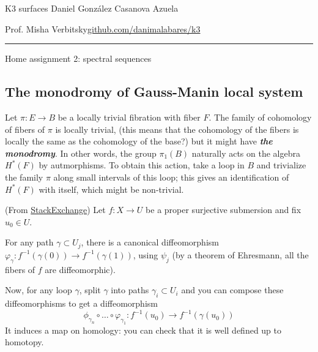 

\usepackage[style=authortitle-terse,backend=bibtex]{biblatex}


\setcounter{secnumdepth}{0}



\begin{minipage}{\textwidth}
	\begin{minipage}{1\textwidth}
		K3 surfaces \hfill Daniel González Casanova Azuela
		
		{\small Prof. Misha Verbitsky\hfill\href{https://github.com/danimalabares/k3}{github.com/danimalabares/k3}}
	\end{minipage}
\end{minipage}\vspace{.2cm}\hrule

\vspace{10pt}
{\huge Home assignment 2: spectral sequences}

\setcounter{section}{2}
\subsection{The monodromy of Gauss-Manin local system}

\begin{manualdef}{2.1}
	Let $\pi:E\to B$ be a locally trivial fibration with fiber $F$. The family of cohomology of fibers of $\pi$ is locally trivial, {\color{magenta}(this means that the cohomology of the fibers is locally the same as the cohomology of the base?)} but it might have \textit{\textbf{the monodromy}}. In other words, the group $\pi_{1}(B)$ naturally acts on the algebra $H^{*}(F)$ by autmorphisms. To obtain this action, take a loop in $B$ and trivialize the family $ \pi$ along small intervals of this loop; this gives an identification of $H^{*}(F)$ with itself, which might be non-trivial.
\end{manualdef}

\begin{remark}
	(From \href{https://math.stackexchange.com/questions/2845794/monodromy-on-cohomology}{StackExchange}) Let $f:X\to U$ be a proper surjective submersion and fix $u_0\in U$.

	For any path $\gamma \subset U_j$, there is a canonical diffeomorphism $\varphi_\gamma:f^{-1}(\gamma(0))\to f^{-1}(\gamma(1))$, using $\psi_j$ (by a theorem of Ehresmann, all the fibers of $f$ are diffeomorphic).

	Now, for any loop $\gamma$, split $\gamma$ into paths $\gamma_i\subset U_i$ and you can compose these diffeomorphisms to get a diffeomorphism
	 \[\phi_{\gamma_n}\circ \ldots\circ \varphi_{\gamma_1}:f^{-1}(u_0)\to f^{-1}(\gamma(u_0))\]
	 It induces a map on homology: you can check that it is well defined up to homotopy.
\end{remark}

